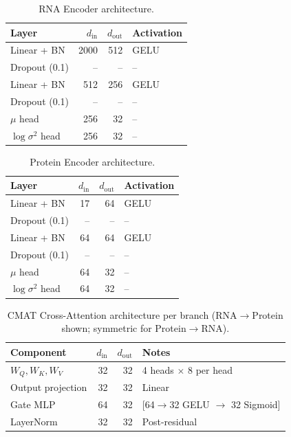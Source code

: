 \documentclass[11pt,a4paper]{article}
\begin{document}
\begin{table}[!ht]
\centering
\caption{RNA Encoder architecture.}
\label{tab:rna_enc}
\scriptsize
\begin{tabular}{lrrl}
\toprule
\textbf{Layer} & \textbf{$d_\text{in}$} & \textbf{$d_\text{out}$} & \textbf{Activation} \\
\midrule
Linear + BN     & 2000 & 512 & GELU \\
Dropout (0.1)   & --   & --  & -- \\
Linear + BN     & 512  & 256 & GELU \\
Dropout (0.1)   & --   & --  & -- \\
$\mu$ head      & 256  & 32  & -- \\
$\log\sigma^2$ head & 256 & 32 & -- \\
\bottomrule
\end{tabular}
\end{table}

\begin{table}[!ht]
\centering
\caption{Protein Encoder architecture.}
\label{tab:prot_enc}
\scriptsize
\begin{tabular}{lrrl}
\toprule
\textbf{Layer} & \textbf{$d_\text{in}$} & \textbf{$d_\text{out}$} & \textbf{Activation} \\
\midrule
Linear + BN     & 17  & 64 & GELU \\
Dropout (0.1)   & --  & -- & -- \\
Linear + BN     & 64  & 64 & GELU \\
Dropout (0.1)   & --  & -- & -- \\
$\mu$ head      & 64  & 32 & -- \\
$\log\sigma^2$ head & 64 & 32 & -- \\
\bottomrule
\end{tabular}
\end{table}

\begin{table}[!ht]
\centering
\caption{CMAT Cross-Attention architecture per branch (RNA$\to$Protein shown; symmetric for Protein$\to$RNA).}
\label{tab:cmat_arch}
\scriptsize
\begin{tabular}{lrrl}
\toprule
\textbf{Component} & \textbf{$d_\text{in}$} & \textbf{$d_\text{out}$} & \textbf{Notes} \\
\midrule
$W_Q, W_K, W_V$ & 32 & 32 & 4 heads $\times$ 8 per head \\
Output projection & 32 & 32 & Linear \\
Gate MLP          & 64 & 32 & [64$\to$32 GELU $\to$ 32 Sigmoid] \\
LayerNorm         & 32 & 32 & Post-residual \\
\bottomrule
\end{tabular}
\end{table}
\end{document}
